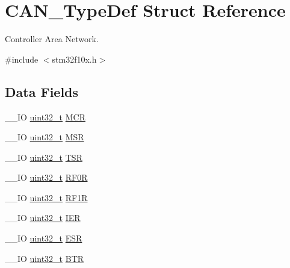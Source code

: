 \hypertarget{struct_c_a_n___type_def}{\section{C\-A\-N\-\_\-\-Type\-Def Struct Reference}
\label{struct_c_a_n___type_def}
}


Controller Area Network.  




{\ttfamily \#include $<$stm32f10x.\-h$>$}

\subsection*{Data Fields}
\begin{DoxyCompactItemize}
\item 
\-\_\-\-\_\-\-I\-O \hyperlink{stdint_8h_a435d1572bf3f880d55459d9805097f62}{uint32\-\_\-t} \hyperlink{struct_c_a_n___type_def_a1282eee79a22003257a7a5daa7f4a35f}{M\-C\-R}
\item 
\-\_\-\-\_\-\-I\-O \hyperlink{stdint_8h_a435d1572bf3f880d55459d9805097f62}{uint32\-\_\-t} \hyperlink{struct_c_a_n___type_def_af98b957a4e887751fbd407d3e2cf93b5}{M\-S\-R}
\item 
\-\_\-\-\_\-\-I\-O \hyperlink{stdint_8h_a435d1572bf3f880d55459d9805097f62}{uint32\-\_\-t} \hyperlink{struct_c_a_n___type_def_acbc82ac4e87e75350fc586be5e56d95b}{T\-S\-R}
\item 
\-\_\-\-\_\-\-I\-O \hyperlink{stdint_8h_a435d1572bf3f880d55459d9805097f62}{uint32\-\_\-t} \hyperlink{struct_c_a_n___type_def_ad8e858479e26ab075ee2ddb630e8769d}{R\-F0\-R}
\item 
\-\_\-\-\_\-\-I\-O \hyperlink{stdint_8h_a435d1572bf3f880d55459d9805097f62}{uint32\-\_\-t} \hyperlink{struct_c_a_n___type_def_a69a528d1288c1de666df68655af1d20e}{R\-F1\-R}
\item 
\-\_\-\-\_\-\-I\-O \hyperlink{stdint_8h_a435d1572bf3f880d55459d9805097f62}{uint32\-\_\-t} \hyperlink{struct_c_a_n___type_def_a530babbc4b9584c93a1bf87d6ce8b8dc}{I\-E\-R}
\item 
\-\_\-\-\_\-\-I\-O \hyperlink{stdint_8h_a435d1572bf3f880d55459d9805097f62}{uint32\-\_\-t} \hyperlink{struct_c_a_n___type_def_ab1a1b6a7c587443a03d654d3b9a94423}{E\-S\-R}
\item 
\-\_\-\-\_\-\-I\-O \hyperlink{stdint_8h_a435d1572bf3f880d55459d9805097f62}{uint32\-\_\-t} \hyperlink{struct_c_a_n___type_def_accad1e4155459a13369f5ad0e7c6da29}{B\-T\-R}
\item 

\end{DoxyCompactItemize}
